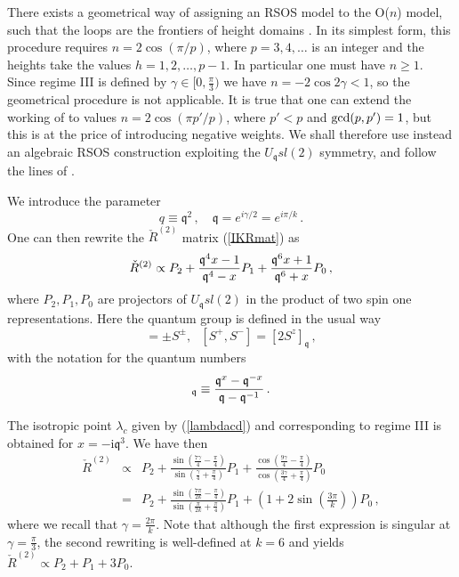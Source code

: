 \documentclass[11pt]{article}
\newcommand{\q}{\mathfrak{q}}
\begin{document}
There exists a geometrical way of assigning an RSOS model to the O($n$) model, such that the loops are the frontiers of height domains \cite{NienhuisRSOS}.
In its simplest form, this procedure requires $n = 2 \cos(\pi/p)$, where $p=3,4,\ldots$ is an integer and the heights take the values $h=1,2,\ldots,p-1$.
In particular one must have $n \ge 1$. Since regime III is defined by $\gamma \in [0,\frac{\pi}{3})$ we have $n = -2 \cos 2 \gamma < 1$, so the geometrical
procedure is not applicable. It is true that one can extend the working of \cite{NienhuisRSOS} to values $n = 2 \cos(\pi p'/p)$, where $p' < p$ and ${\rm gcd}(p,p')=1$,
but this is at the price of introducing negative weights.
We shall therefore use instead an algebraic RSOS construction exploiting the $U_\q sl(2)$ symmetry, and follow the lines of \cite{Vincent}. 

We introduce the parameter 
%
\begin{equation}
q\equiv \q^2 \,, \quad \q=e^{i\gamma/2}=e^{i\pi/k} \,.
\end{equation}
%
One can then rewrite the $\check{R}^{(2)}$ matrix (\ref{IKRmat}) as 
%
\begin{equation}
\check{R}^{(2)}\propto P_2+{\q^4 x-1\over \q^4-x}P_1+{\q^6x+1\over \q^6+x}P_0 \,,
\label{eq:R2appendix}
\end{equation}
%
where $P_2,P_1,P_0$ are projectors of $U_{\q}sl(2)$ in the product of two spin one representations. Here the quantum group is defined in the usual way
%
\begin{equation}
[S^z,S^\pm]=\pm S^\pm,~~~[S^+,S^-]=[2S^z]_{\q} \,,
\end{equation}
%
with the notation for the quantum numbers
%
\begin{equation}
[x]_\q\equiv {\q^x-\q^{-x}\over \q-\q^{-1}} \,.
\end{equation}
%

The isotropic point $\lambda_c$ given by (\ref{lambdacd}) and corresponding to regime III is obtained for $x = - \mathrm{i} \mathfrak{q}^3$. We have then
%
\begin{eqnarray}
\check{R}^{(2)} &\propto& P_2 + \frac{\sin\left( \frac{7\gamma}{4}- \frac{\pi }{4} \right)}{\sin\left( \frac{\gamma}{4}+ \frac{\pi }{4} \right)} P_1 + \frac{\cos\left( \frac{9\gamma}{4} - \frac{\pi}{4} \right)}{\cos\left( \frac{3\gamma}{4} + \frac{\pi}{4} \right)} P_0 \\
&=& P_2 + \frac{\sin\left( \frac{7\pi}{2 k}- \frac{\pi }{4} \right)}{\sin\left( \frac{\pi}{2k}+ \frac{\pi }{4} \right)} P_1 + \left( 1 + 2 \sin \left( \frac{3 \pi}{k} \right) \right) P_0 \,,
\end{eqnarray}
%
where we recall that $\gamma = \frac{2\pi}{k}$. Note that although the first expression is singular at $\gamma = \frac{\pi}{3}$, the second rewriting is well-defined at $k=6$ and yields $\check{R}^{(2)} \propto P_2 + P_1 + 3 P_0$.
\end{document}
